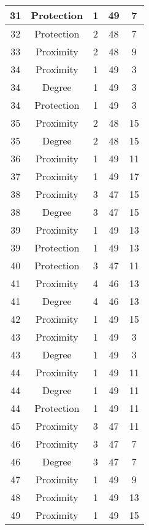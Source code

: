 \documentclass[results.tex]{subfiles}
\begin{document}
\begin{center}
\begin{tabular}{| c || c | c | c | c |}
    31 & Protection & 1 & 49 & 7 \\ 
    \hline
    32 & Protection & 2 & 48 & 7 \\ 
    \hline
    33 & Proximity & 2 & 48 & 9 \\ 
    \hline
    34 & Proximity & 1 & 49 & 3 \\ 
    \hline
    34 & Degree & 1 & 49 & 3 \\ 
    \hline
    34 & Protection & 1 & 49 & 3 \\ 
    \hline
    35 & Proximity & 2 & 48 & 15 \\ 
    \hline
    35 & Degree & 2 & 48 & 15 \\ 
    \hline
    36 & Proximity & 1 & 49 & 11 \\ 
    \hline
    37 & Proximity & 1 & 49 & 17 \\ 
    \hline
    38 & Proximity & 3 & 47 & 15 \\ 
    \hline
    38 & Degree & 3 & 47 & 15 \\ 
    \hline
    39 & Proximity & 1 & 49 & 13 \\ 
    \hline
    39 & Protection & 1 & 49 & 13 \\ 
    \hline
    40 & Protection & 3 & 47 & 11 \\ 
    \hline
    41 & Proximity & 4 & 46 & 13 \\ 
    \hline
    41 & Degree & 4 & 46 & 13 \\ 
    \hline
    42 & Proximity & 1 & 49 & 15 \\ 
    \hline
    43 & Proximity & 1 & 49 & 3 \\ 
    \hline
    43 & Degree & 1 & 49 & 3 \\ 
    \hline
    44 & Proximity & 1 & 49 & 11 \\ 
    \hline
    44 & Degree & 1 & 49 & 11 \\ 
    \hline
    44 & Protection & 1 & 49 & 11 \\ 
    \hline
    45 & Proximity & 3 & 47 & 11 \\ 
    \hline
    46 & Proximity & 3 & 47 & 7 \\ 
    \hline
    46 & Degree & 3 & 47 & 7 \\ 
    \hline
    47 & Proximity & 1 & 49 & 9 \\ 
    \hline
    48 & Proximity & 1 & 49 & 13 \\ 
    \hline
    49 & Proximity & 1 & 49 & 15 \\ 
    \hline   \end{tabular}
\end{center}
\end{document}
